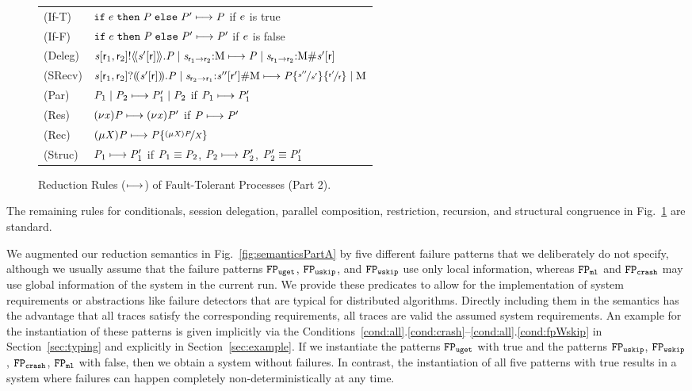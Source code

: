 \begin{figure}[t]
	\renewcommand{\tabcolsep}{2pt}
	\begin{tabular}{ll}
		(\textsf{If-T}) & $ \mathtt{if} \; e \; \mathtt{then} \; \mathit{P} \; \mathtt{else} \; \mathit{P}' \longmapsto \mathit{P} $ \hspace{15em} if $ e $ is true\\
		(\textsf{If-F}) & $ \mathtt{if} \; e \; \mathtt{then} \; \mathit{P} \; \mathtt{else} \; \mathit{P}' \longmapsto \mathit{P}' $ \hfill if $ e $ is false\\
		(\textsf{Deleg}) & $ \mathit{s}{\left[ \mathsf{r}_1, \mathsf{r}_2 \right]}\mathsf{!}{\left<\!{\left< \mathit{s}'{\left[ \mathsf{r} \right]} \right>}\!\right>}.\mathit{P} \mid \mathit{s}_{\mathsf{r}_1 \to \mathsf{r}_2}{:}\mathrm{M} \longmapsto \mathit{P} \mid \mathit{s}_{\mathsf{r}_1 \to \mathsf{r}_2}{:}\mathrm{M}\#\mathit{s}'{\left[ \mathsf{r} \right]} $\\
		(\textsf{SRecv}) & $ \mathit{s}{\left[ \mathsf{r}_1, \mathsf{r}_2 \right]}\mathsf{?}{\left(\!{\left( \mathit{s}'{\left[ \mathsf{r} \right]} \right)}\!\right)}.\mathit{P} \mid \mathit{s}_{\mathsf{r}_2 \to \mathsf{r}_1}{:}\mathit{s}''{\left[ \mathsf{r}' \right]}\#\mathrm{M} \longmapsto \mathit{P}{\left\lbrace   \nicefrac{\mathit{s}''}{\mathit{s}'}   \right\rbrace}{\left\lbrace   \nicefrac{\mathsf{r}'}{\mathsf{r}}   \right\rbrace} \mid \mathrm{M} $\\
		(\textsf{Par}) & $ \mathit{P}_1 \mid \mathit{P}_2 \longmapsto \mathit{P}_1' \mid \mathit{P}_2 $ \hfill if $ \mathit{P}_1 \longmapsto \mathit{P}_1' $\\
		(\textsf{Res}) & $ {\left( \nu \mathit{x} \right)} \mathit{P} \longmapsto {\left( \nu \mathit{x} \right)} \mathit{P}' $ \hfill if $ \mathit{P} \longmapsto \mathit{P}' $\\
		(\textsf{Rec}) & $ {\left( \mu \mathit{X} \right)} \mathit{P} \longmapsto \mathit{P}{\left\lbrace   \nicefrac{{\left( \mu \mathit{X} \right)} \mathit{P}}{\mathit{X}}   \right\rbrace} $\\
		(\textsf{Struc}) & $ \mathit{P}_1 \longmapsto \mathit{P}_1' $ \hfill if $ \mathit{P}_1 \equiv \mathit{P}_2 $, $ \mathit{P}_2 \longmapsto \mathit{P}_2' $, $ \mathit{P}_2' \equiv \mathit{P}_1' $
	\end{tabular}
	\caption{Reduction Rules ($ \longmapsto $) of Fault-Tolerant Processes (Part 2).}
	\label{fig:semanticsPartB}
\end{figure}

The remaining rules for conditionals, session delegation, parallel composition, restriction, recursion, and structural congruence in Fig.~\ref{fig:semanticsPartB} are standard.

We augmented our reduction semantics in Fig.~\ref{fig:semanticsPartA} by five different failure patterns that we deliberately do not specify, although we usually assume that the failure patterns $ \mathtt{FP}_{\mathtt{uget}} $, $ \mathtt{FP}_{\mathtt{uskip}} $, and $ \mathtt{FP}_{\mathtt{wskip}} $ use only local information, whereas $ \mathtt{FP}_{\mathtt{ml}} $ and $ \mathtt{FP}_{\mathtt{crash}} $ may use global information of the system in the current run.
We provide these predicates to allow for the implementation of system requirements or abstractions like failure detectors that are typical for distributed algorithms.
Directly including them in the semantics has the advantage that all traces satisfy the corresponding requirements, \ie all traces are valid \wrt the assumed system requirements.
An example for the instantiation of these patterns is given implicitly via the Conditions~\ref{cond:all}.\ref{cond:crash}--\ref{cond:all}.\ref{cond:fpWskip} in Section~\ref{sec:typing} and explicitly in Section~\ref{sec:example}.
If we instantiate the patterns $ \mathtt{FP}_{\mathtt{uget}} $ with true and the patterns $ \mathtt{FP}_{\mathtt{uskip}} $, $ \mathtt{FP}_{\mathtt{wskip}} $, $ \mathtt{FP}_{\mathtt{crash}} $, $ \mathtt{FP}_{\mathtt{ml}} $ with false, then we obtain a system without failures.
In contrast, the instantiation of all five patterns with true results in a system where failures can happen completely non-deterministically at any time.

